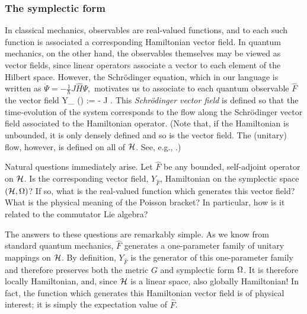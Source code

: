 \subsubsection{The symplectic form}

In classical mechanics, observables are real-valued functions, and to
each such function is associated a corresponding Hamiltonian vector
field.  In quantum mechanics, on the other hand, the observables
themselves may be viewed as vector fields, since linear operators
associate a vector to each element of the Hilbert space.  However, the
Schr\"odinger equation, which in our language is written as $ \dot\Psi
= - \frac{1}{\hbar} J \hat{H} \Psi, $ motivates us to associate to
each quantum observable $\hat{F}$ the vector field 
% 
\be
\label{schrodinger_vf}
      Y_{} (\Psi) := - J  \Psi.
\ee
%
This {\em Schr\"odinger vector field} is defined so that the
time-evolution of the system corresponds to the flow along the
Schr\"odinger vector field associated to the Hamiltonian operator.
(Note that, if the Hamiltonian is unbounded, it is only densely
defined and so is the vector field. The (unitary) flow, however, is
defined on all of ${\cal H}$. See, e.g., \cite{chernoff_marsden}.)

Natural questions immediately arise.  Let $\hat{F}$ be any bounded,
self-adjoint operator on ${\cal H}$.  Is the corresponding vector field,
$Y_{\hat{F}}$, Hamiltonian on the symplectic space $({\cal H}, \Omega)$?  If
so, what is the real-valued function which generates this vector
field?  What is the physical meaning of the Poisson bracket?  In
particular, how is it related to the commutator Lie algebra?

The answers to these questions are remarkably simple.  As we know from
standard quantum mechanics, $\hat{F}$ generates a one-parameter family
of unitary mappings on ${\cal H}$.  By definition, $Y_{\hat{F}}$ is the
generator of this one-parameter family and therefore preserves both
the metric $G$ and symplectic form $\Omega$.  It is therefore locally
Hamiltonian, and, since ${\cal H}$ is a linear space, also globally
Hamiltonian!  In fact, the function which generates this Hamiltonian
vector field is of physical interest; it is simply the expectation
value of $\hat{F}$.

